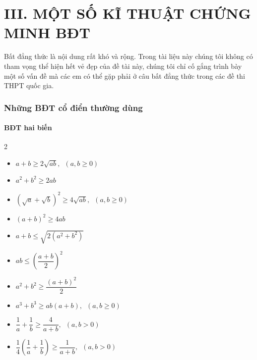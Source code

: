 \setcounter{section}{0}
\part*{III. MỘT SỐ KĨ THUẬT CHỨNG MINH BĐT}

Bất đẳng thức là nội dung rất khó và rộng. Trong tài liệu này chúng tôi không có tham vọng thể hiện hết vẻ đẹp của đề tài này, chúng tôi chỉ cố gắng trình bày một số vấn đề mà các em có thể gặp phải ở câu bất đẳng thức trong các đề thi THPT quốc gia.

\section{Những BĐT cổ điển thường dùng}
\subsection{BĐT hai biến}
\begin{multicols}{2}
\begin{itemize}
\item $a+b\ge 2\sqrt{ab},\,\,\,\left( a,b\ge 0 \right)$
\item ${{a}^{2}}+{{b}^{2}}\ge 2ab$
\item ${{\left( \sqrt{a}+\sqrt{b} \right)}^{2}}\ge 4\sqrt{ab},\,\,\,\left( a,b\ge 0 \right)$
\item ${{\left( a+b \right)}^{2}}\ge 4ab $
\item $a+b\le \sqrt{2\left( {{a}^{2}}+{{b}^{2}} \right)} $
\item $ab\le {{\left( \dfrac{a+b}{2} \right)}^{2}} $
\item ${{a}^{2}}+{{b}^{2}}\ge \dfrac{{{\left( a+b \right)}^{2}}}{2} $
\item ${{a}^{3}}+{{b}^{3}}\ge ab\left( a+b \right),\,\,\,\left( a,b\ge 0 \right)$
\item $\dfrac{1}{a}+\dfrac{1}{b}\ge \dfrac{4}{a+b},\,\,\,\left( a,b>0 \right)$
\item $\dfrac{1}{4}\left( \dfrac{1}{a}+\dfrac{1}{b} \right)\ge \dfrac{1}{a+b},\,\,\,\left( a,b>0 \right)$
\end{itemize}
\end{multicols}
